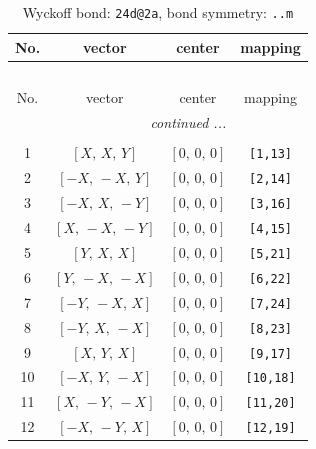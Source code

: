 \documentclass[fleqn,8pt]{jsarticle}
\begin{document}
\renewcommand{\arraystretch}{1.2}
\begin{longtable}{cccc}
\caption{Wyckoff bond: {\tt 24d@2a}, bond symmetry: {\tt ..m}}
 \\
 \hline \hline
No. & vector & center & mapping \\ \hline \endfirsthead

\multicolumn{3}{l}{\tablename\ \thetable{}} \\
 \hline \hline
No. & vector & center & mapping \\ \hline \endhead

 \hline \hline
\multicolumn{3}{r}{\footnotesize\it continued ...} \\ \endfoot

 \hline \hline
\multicolumn{3}{r}{} \\ \endlastfoot

1 & $\left[ X,\, X,\, Y \right]$ & $\left[ 0,\, 0,\, 0 \right]$ & {\tt [1,13]} \\ \hline
2 & $\left[ - X,\, - X,\, Y \right]$ & $\left[ 0,\, 0,\, 0 \right]$ & {\tt [2,14]} \\ \hline
3 & $\left[ - X,\, X,\, - Y \right]$ & $\left[ 0,\, 0,\, 0 \right]$ & {\tt [3,16]} \\ \hline
4 & $\left[ X,\, - X,\, - Y \right]$ & $\left[ 0,\, 0,\, 0 \right]$ & {\tt [4,15]} \\ \hline
5 & $\left[ Y,\, X,\, X \right]$ & $\left[ 0,\, 0,\, 0 \right]$ & {\tt [5,21]} \\ \hline
6 & $\left[ Y,\, - X,\, - X \right]$ & $\left[ 0,\, 0,\, 0 \right]$ & {\tt [6,22]} \\ \hline
7 & $\left[ - Y,\, - X,\, X \right]$ & $\left[ 0,\, 0,\, 0 \right]$ & {\tt [7,24]} \\ \hline
8 & $\left[ - Y,\, X,\, - X \right]$ & $\left[ 0,\, 0,\, 0 \right]$ & {\tt [8,23]} \\ \hline
9 & $\left[ X,\, Y,\, X \right]$ & $\left[ 0,\, 0,\, 0 \right]$ & {\tt [9,17]} \\ \hline
10 & $\left[ - X,\, Y,\, - X \right]$ & $\left[ 0,\, 0,\, 0 \right]$ & {\tt [10,18]} \\ \hline
11 & $\left[ X,\, - Y,\, - X \right]$ & $\left[ 0,\, 0,\, 0 \right]$ & {\tt [11,20]} \\ \hline
12 & $\left[ - X,\, - Y,\, X \right]$ & $\left[ 0,\, 0,\, 0 \right]$ & {\tt [12,19]} \\
\end{longtable}
\renewcommand{\arraystretch}{1.2}
\end{document}
